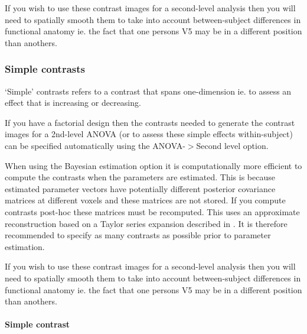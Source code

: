 \documentclass[a4paper,titlepage]{book}
\begin{document}
                                                                                                            

If you wish to use these contrast images for a second-level analysis then you will need to spatially smooth them to take into account between-subject differences in functional anatomy ie. the fact that one persons V5 may be in a different position than anothers. 


\subsubsection{Simple contrasts}
`Simple' contrasts refers to a contrast that spans one-dimension ie. to assess an effect that is increasing or decreasing.

                                                                                                            

If you have a factorial design then the contrasts needed to generate the contrast images for a 2nd-level ANOVA (or to assess these simple effects within-subject) can be specified automatically using the ANOVA-$>$Second level option.

                                                                                                            

When using the Bayesian estimation option it is computationally more efficient to compute the contrasts when the parameters are estimated. This is because estimated parameter vectors have potentially different posterior covariance matrices at different voxels and these matrices are not stored. If you compute contrasts post-hoc these matrices must be recomputed. This uses an approximate reconstruction based on a Taylor series expansion described in \cite{vb3}. It is therefore recommended to specify as many contrasts as possible prior to parameter estimation.

                                                                                                            

If you wish to use these contrast images for a second-level analysis then you will need to spatially smooth them to take into account between-subject differences in functional anatomy ie. the fact that one persons V5 may be in a different position than anothers. 


\paragraph{Simple contrast}
\end{document}
